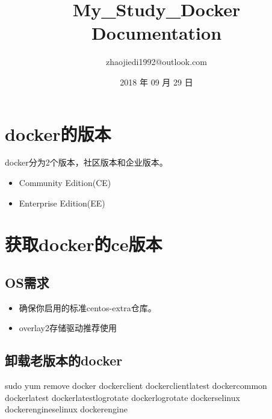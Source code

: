 \documentclass[letterpaper,10pt,english]{sphinxmanual}
\title{My\_Study\_Docker Documentation}
\date{2018 年 09 月 29 日}
\author{zhaojiedi1992@outlook.com}
\begin{document}
\maketitle
\sphinxtableofcontents
{}\label{\detokenize{index::doc}}



\chapter{docker的版本}
\label{\detokenize{_u4e86_u89e3docker/01-docker_u7684_u7248_u672c:docker}}\label{\detokenize{_u4e86_u89e3docker/01-docker_u7684_u7248_u672c::doc}}
docker分为2个版本，社区版本和企业版本。
\begin{itemize}
\item {} 
Community Edition(CE)

\item {} 
Enterprise Edition(EE)

\end{itemize}


\chapter{获取docker的ce版本}
\label{\detokenize{_u4e86_u89e3docker/02-_u83b7_u53d6docker_u7684ce_u7248_u672c::doc}}\label{\detokenize{_u4e86_u89e3docker/02-_u83b7_u53d6docker_u7684ce_u7248_u672c:dockerce}}

\section{OS需求}
\label{\detokenize{_u4e86_u89e3docker/02-_u83b7_u53d6docker_u7684ce_u7248_u672c:os}}\begin{itemize}
\item {} 
确保你启用的标准centos-extra仓库。

\item {} 
overlay2存储驱动推荐使用

\end{itemize}


\section{卸载老版本的docker}
\label{\detokenize{_u4e86_u89e3docker/02-_u83b7_u53d6docker_u7684ce_u7248_u672c:docker}}
%
\begin{sphinxVerbatim}[commandchars=\\\{\}]
\PYGZdl{} sudo yum remove docker 
                docker\PYGZhy{}client 
                docker\PYGZhy{}client\PYGZhy{}latest 
                docker\PYGZhy{}common 
                docker\PYGZhy{}latest 
                docker\PYGZhy{}latest\PYGZhy{}logrotate 
                docker\PYGZhy{}logrotate 
                docker\PYGZhy{}selinux 
                docker\PYGZhy{}engine\PYGZhy{}selinux 
                docker\PYGZhy{}engine
\end{sphinxVerbatim}
\end{document}
